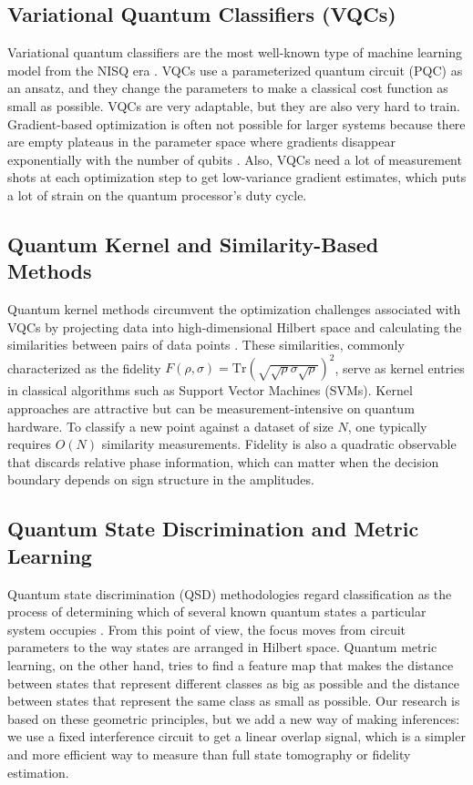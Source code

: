 \documentclass[conference]{IEEEtran}
\begin{document}
\subsection{Variational Quantum Classifiers (VQCs)}

Variational quantum classifiers are the most well-known type of machine learning model from the NISQ era \cite{benedetti2019parameterized,abbas2021power}. VQCs use a parameterized quantum circuit (PQC) as an ansatz, and they change the parameters to make a classical cost function as small as possible. VQCs are very adaptable, but they are also very hard to train. Gradient-based optimization is often not possible for larger systems because there are empty plateaus in the parameter space where gradients disappear exponentially with the number of qubits \cite{mcclean2018barren}. Also, VQCs need a lot of measurement shots at each optimization step to get low-variance gradient estimates, which puts a lot of strain on the quantum processor's duty cycle.

\subsection{Quantum Kernel and Similarity-Based Methods}

Quantum kernel methods circumvent the optimization challenges associated with VQCs by projecting data into high-dimensional Hilbert space and calculating the similarities between pairs of data points \cite{schuld2019feature,havlicek2019supervised}. These similarities, commonly characterized as the fidelity $F(\rho, \sigma) = \text{Tr}(\sqrt{\sqrt{\rho}\sigma\sqrt{\rho}})^2$, serve as kernel entries in classical algorithms such as Support Vector Machines (SVMs). Kernel approaches are attractive but can be measurement-intensive on quantum hardware. To classify a new point against a dataset of size $N$, one typically requires $O(N)$ similarity measurements. Fidelity is also a quadratic observable that discards relative phase information, which can matter when the decision boundary depends on sign structure in the amplitudes.

\subsection{Quantum State Discrimination and Metric Learning}

Quantum state discrimination (QSD) methodologies regard classification as the process of determining which of several known quantum states a particular system occupies \cite{sergioli2019binary,gonzalez2021classification}. From this point of view, the focus moves from circuit parameters to the way states are arranged in Hilbert space. Quantum metric learning, on the other hand, tries to find a feature map that makes the distance between states that represent different classes as big as possible and the distance between states that represent the same class as small as possible. Our research is based on these geometric principles, but we add a new way of making inferences: we use a fixed interference circuit to get a linear overlap signal, which is a simpler and more efficient way to measure than full state tomography or fidelity estimation.
\end{document}
